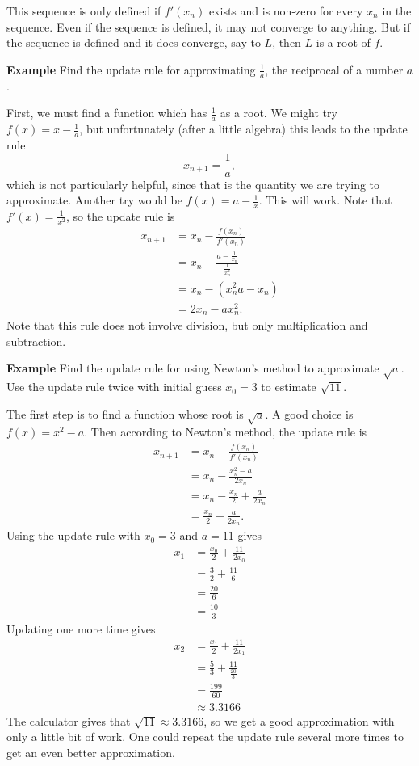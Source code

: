 \documentclass[twoside,openright,titlepage,a4paper]{book}
\begin{document}
\begin{sloppypar}
This sequence is only defined if $f'(x_n)$ exists and is non-zero for every $x_n$ in the sequence. Even if the sequence is defined, it may not converge to anything. But if the sequence is defined and it does converge, say to $L$, then $L$ is a root of $f$.

\textbf{Example} Find the update rule for approximating $\frac{1}{a}$, the reciprocal of a number $a$.
\begin{examplebox}
First, we must find a function which has $\frac{1}{a}$ as a root. We might try $f(x) = x-\frac{1}{a}$, but unfortunately (after a little algebra) this leads to the update rule \[ x_{n+1} = \frac{1}{a}, \] which is not particularly helpful, since that is the quantity we are trying to approximate.
Another try would be $f(x) = a- \frac{1}{x}$. This will work. Note that $f'(x) = \frac{1}{x^2}$, so the update rule is
\begin{align*}
x_{n+1} &= x_n - \frac{f(x_n)}{f'(x_n)} \\
&= x_n - \frac{a-\frac{1}{x_n}}{\frac{1}{x_n^2}} \\
&= x_n - \left(x_n^2 a - x_n\right) \\
&= 2x_n - a x_n^2.
\end{align*}
Note that this rule does not involve division, but only multiplication and subtraction.	
\end{examplebox}	

\textbf{Example} Find the update rule for using Newton's method to approximate $\sqrt{a}$. Use the update rule twice with initial guess $x_0 = 3$ to estimate $\sqrt{11}$.
\begin{examplebox}
The first step is to find a function whose root is $\sqrt{a}$. A good choice is $f(x) = x^2-a$. Then according to Newton's method, the update rule is
\begin{align*}
x_{n+1} &= x_n - \frac{f(x_n)}{f'(x_n)} \\
&= x_n - \frac{x_n^2-a}{2x_n} \\
&= x_n - \frac{x_n}{2} + \frac{a}{2x_n} \\
&= \frac{x_n}{2} + \frac{a}{2x_n}.
\end{align*}
Using the update rule with $x_0 = 3$ and $a = 11$ gives
\begin{align*}
x_1 &= \frac{x_0}{2} + \frac{11}{2x_0} \\
&= \frac{3}{2} + \frac{11}{6} \\
&= \frac{20}{6} \\
&= \frac{10}{3}
\end{align*}
Updating one more time gives
\begin{align*} 
x_2 &= \frac{x_1}{2} + \frac{11}{2x_1} \\
&= \frac{5}{3} + \frac{11}{\frac{20}{3}} \\
&= \frac{199}{60} \\
& \approx 3.3166 
\end{align*}
The calculator gives that $\sqrt{11} \approx 3.3166$, so we get a good approximation with only a little bit of work. One could repeat the update rule several more times to get an even better approximation.	
\end{examplebox}


\end{sloppypar}
\end{document}
